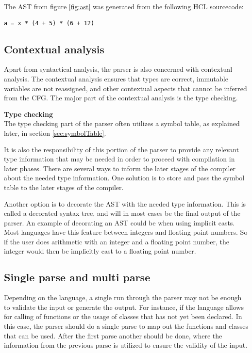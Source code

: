 The AST from figure \ref{fig:ast} was generated from the following HCL sourcecode:
\begin{lstlisting}[language=HCL,label=lis:parser:AST,firstnumber=1]
a = x * (4 + 5) * (6 + 12)
\end{lstlisting}


\subsection{Contextual analysis}
Apart from syntactical analysis, the parser is also concerned with contextual analysis. 
The contextual analysis ensures that types are correct, immutable variables are not reassigned, and other contextual aspects that cannot be inferred from the CFG.
The major part of the contextual analysis is the type checking.

\textbf{Type checking}\\
The type checking part of the parser often utilizes a symbol table, as explained later, in section \ref{sec:symbolTable}.

It is also the responsibility of this portion of the parser to provide any relevant type information that may be needed in order to proceed with compilation in later phases. 
There are several ways to inform the later stages of the compiler about the needed type information. 
One solution is to store and pass the symbol table to the later stages of the compiler. 

Another option is to decorate the AST with the needed type information. 
This is called a decorated syntax tree, and will in most cases be the final output of the parser.
An example of decorating an AST could be when using implicit casts. 
Most languages have this feature between integers and floating point numbers. 
So if the user does arithmetic with an integer and a floating point number, the integer would then be implicitly cast to a floating point number.

\subsection{Single parse and multi parse}
Depending on the language, a single run through the parser may not be enough to validate the input or generate the output. 
For instance, if the language allows for calling of functions or the usage of classes that has not yet been declared.
In this case, the parser should do a single parse to map out the functions and classes that can be used. 
After the first parse another should be done, where the information from the previous parse is utilized to ensure the validity of the input. 

